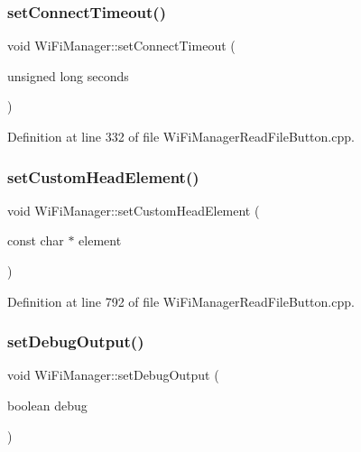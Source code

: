 \subsubsection{\texorpdfstring{set\+Connect\+Timeout()}{setConnectTimeout()}}
{\footnotesize\ttfamily void Wi\+Fi\+Manager\+::set\+Connect\+Timeout (\begin{DoxyParamCaption}\item[{unsigned long}]{seconds }\end{DoxyParamCaption})}



Definition at line 332 of file Wi\+Fi\+Manager\+Read\+File\+Button.\+cpp.

\mbox{\label{class_wi_fi_manager_a85570bcfe03da48c4be75b8e4302c4db}} 
\subsubsection{\texorpdfstring{set\+Custom\+Head\+Element()}{setCustomHeadElement()}}
{\footnotesize\ttfamily void Wi\+Fi\+Manager\+::set\+Custom\+Head\+Element (\begin{DoxyParamCaption}\item[{const char $\ast$}]{element }\end{DoxyParamCaption})}



Definition at line 792 of file Wi\+Fi\+Manager\+Read\+File\+Button.\+cpp.

\mbox{\label{class_wi_fi_manager_a70d7f17596b9f10c3e4770702ac991c5}} 
\subsubsection{\texorpdfstring{set\+Debug\+Output()}{setDebugOutput()}}
{\footnotesize\ttfamily void Wi\+Fi\+Manager\+::set\+Debug\+Output (\begin{DoxyParamCaption}\item[{boolean}]{debug }\end{DoxyParamCaption})}



